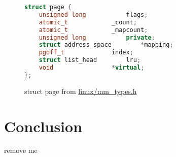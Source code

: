 \documentclass[letterpaper,draftclsnofoot,10pt,onecolumn,titlepage]{IEEEtran}\usepackage[margin=0.75in]{geometry}
\begin{document}
\begin{figure}[H]
\caption{struct page from \url{linux/mm_types.h}}
\begin{lstlisting}[language=C++]
struct page {
	unsigned long 			flags;
	atomic_t			_count;
	atomic_t			_mapcount;
	unsigned long			private;
	struct address_space		*mapping;
	pgoff_t				index;
	struct list_head		lru;
	void				*virtual;
};
\end{lstlisting}
\end{figure}


\section{Conclusion}


remove me\cite{Windows}


\end{document}
